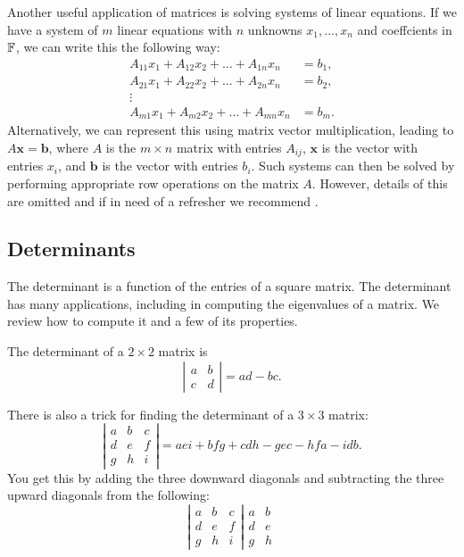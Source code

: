 \documentclass{article}
\begin{document}
Another useful application of matrices is solving systems of linear equations. If we have a system of $m$ linear equations with $n$ unknowns $x_1,\ldots, x_n$ and coeffcients in ${\mathbb{F}}$, we can write this the following way:
\begin{align*}
    A_{11} x_1 + A_{12}x_2 + \ldots + A_{1n}x_n &= b_1,\\
     A_{21} x_1 + A_{22}x_2 + \ldots + A_{2n}x_n &= b_2,\\
     \vdots& \\
      A_{m1} x_1 + A_{m2}x_2 + \ldots + A_{mn}x_n &= b_m.
\end{align*}
Alternatively, we can represent this using matrix vector multiplication, leading to $A\boldsymbol{x} = \boldsymbol{b}$, where $A$ is the $m\times n$ matrix with entries $A_{ij}$, $\boldsymbol{x}$ is the vector with entries $x_i$, and $\boldsymbol{b}$ is the vector with entries $b_i$. Such systems can then be solved by performing appropriate row operations on the matrix $A$. However, details of this are omitted and if in need of a refresher we recommend \cite[Chapter 2]{linalgwrong}.


\subsection{Determinants}
The determinant is a function of the entries of a square matrix. The determinant has many applications, including in computing the eigenvalues of a matrix. We review how to compute it and a few of its properties. 

The determinant of a $2 \times 2$ matrix is 
$$\left| \begin{matrix} a & b \\ c & d \end{matrix} \right| = ad-bc.$$

There is also a trick for finding the determinant of a $3 \times 3$ matrix:
$$\left| \begin{matrix} a & b &c \\ d & e & f \\ g & h &i \end{matrix} \right| = aei + bfg + cdh - gec -hfa -idb.$$
You get this by adding the three downward diagonals and subtracting the three upward diagonals from the following:
$$ \left| \begin{matrix} a & b &c \\ d & e & f \\ g & h &i \end{matrix} \right| \begin{matrix} a & b \\ d & e\\g & h  \end{matrix} $$
\end{document}
